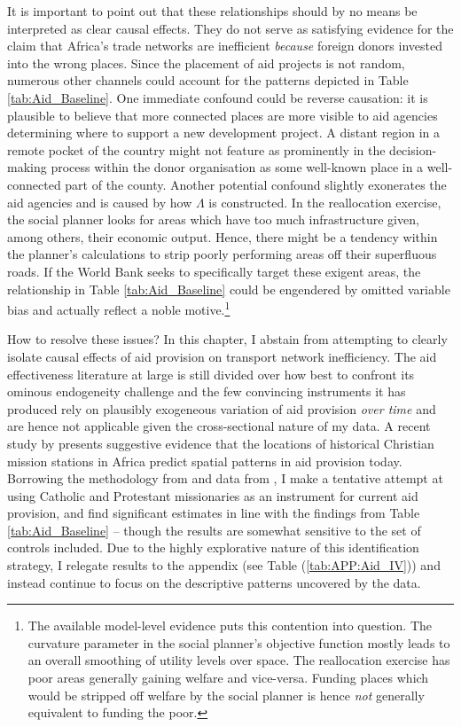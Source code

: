 \documentclass[11pt, oneside]{article}   	%
\let\oldref\ref
\renewcommand{\ref}[1]{(\oldref{#1})}
\begin{document}
It is important to point out that these relationships should by no means be interpreted as clear causal effects. They do not serve as satisfying evidence for the claim that Africa's trade networks are inefficient \emph{because} foreign donors invested into the wrong places. Since the placement of aid projects is not random, numerous other channels could account for the patterns depicted in Table \eqref{tab:Aid_Baseline}. One immediate confound could be reverse causation: it is plausible to believe that more connected places are more visible to aid agencies determining where to support a new development project. A distant region in a remote pocket of the country might not feature as prominently in the decision-making process within the donor organisation as some well-known place in a well-connected part of the county. Another potential confound slightly exonerates the aid agencies and is caused by how $\Lambda$ is constructed. In the reallocation exercise, the social planner looks for areas which have too much infrastructure given, among others, their economic output. Hence, there might be a tendency within the planner's calculations to strip poorly performing areas off their superfluous roads. If the World Bank seeks to specifically target these exigent areas, the relationship in Table \eqref{tab:Aid_Baseline} could be engendered by omitted variable bias and actually reflect a noble motive.\footnote{The available model-level evidence puts this contention into question. The curvature parameter in the social planner's objective function mostly leads to an overall smoothing of utility levels over space. The reallocation exercise has poor areas generally gaining welfare and vice-versa. Funding places which would be stripped off welfare by the social planner is hence \emph{not} generally equivalent to funding the poor.}

How to resolve these issues? In this chapter, I abstain from attempting to clearly isolate causal effects of aid provision on transport network inefficiency. The aid effectiveness literature at large is still divided over how best to confront its ominous endogeneity challenge \citep{Clemens_CountingChickenswhen_2012} and the few convincing instruments it has produced rely on plausibly exogeneous variation of aid provision \emph{over time} \citep{Nunn_USFoodAid_2014,Dreher_AidChinaGrowth_2017,Galiani_effectaidgrowth_2017} and are hence not applicable given the cross-sectional nature of my data. A recent study by \cite{Alpino_LightingPathInfluence_2017} presents suggestive evidence that the locations of historical Christian mission stations in Africa predict spatial patterns in aid provision today. Borrowing the methodology from \cite{Castello-Climent_HigherEducationProsperity_2017} and data from \cite{Nunn_ReligiousConversionColonial_2010}, I make a tentative attempt at using Catholic and Protestant missionaries as an instrument for current aid provision, and find significant estimates in line with the findings from Table \eqref{tab:Aid_Baseline} -- though the results are somewhat sensitive to the set of controls included. Due to the highly explorative nature of this identification strategy, I relegate results to the appendix (see Table \ref{tab:APP:Aid_IV}) and instead continue to focus on the descriptive patterns uncovered by the data.
\end{document}
